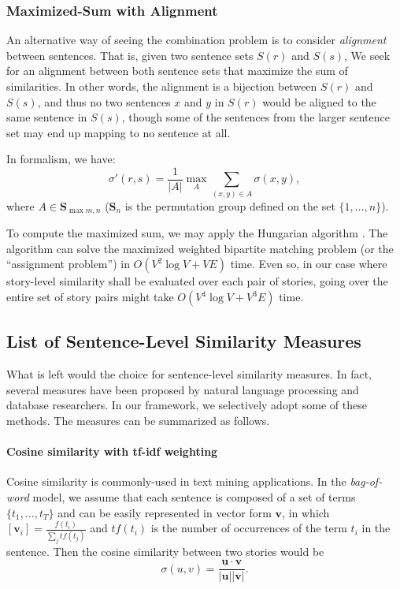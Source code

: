 \documentclass{article}[12pt]
\begin{document}
\subsubsection{Maximized-Sum with Alignment}

An alternative way of seeing the combination problem is to consider
\emph{alignment} between sentences.  That is, given two sentence sets $S(r)$
and $S(s)$, We seek for an alignment between both sentence sets that maximize
the sum of similarities.  In other words, the alignment is a bijection between
$S(r)$ and $S(s)$, and thus no two sentences $x$ and $y$ in $S(r)$ would be
aligned to the same sentence in $S(s)$, though some of the sentences from the
larger sentence set may end up mapping to no sentence at all.  

In formalism, we have: \[\sigma'(r,s) =
\frac{1}{|A|}\max\limits_A \sum\limits_{(x,y) \in A} \sigma(x,y),\] where $A
\in \mathbf{S}_{\max m,n}$ ($\mathbf{S}_n$ is the permutation group defined on
the set $\{1, \ldots, n\}$).  

To compute the maximized sum, we may apply the Hungarian algorithm
\cite{munkres1957aaa}.  The algorithm can solve the maximized weighted
bipartite matching problem (or the ``assignment problem'') in $O(V^2 \log V +
VE)$ time.  Even so, in our case where story-level similarity shall be
evaluated over each pair of stories, going over the entire set of story pairs
might take $O(V^4 \log V + V^3 E)$ time.

\subsection{List of Sentence-Level Similarity Measures}\label{sentencelevel}

What is left would the choice for sentence-level similarity measures.  In fact,
several measures have been proposed by natural language processing and database
researchers.  In our framework, we selectively adopt some of these methods.
The measures can be summarized as follows.

\paragraph{Cosine similarity with tf-idf weighting} Cosine similarity is
commonly-used in text mining applications.  In the \emph{bag-of-word} model, we
assume that each sentence is composed of a set of terms $\{t_1, \ldots, t_T\}$
and can be easily represented in vector form $\mathbf{v}$, in which
$[\mathbf{v}_i] = \frac{f(t_i)}{\sum\limits_j tf(t_j)}$ and $tf(t_i)$ is the
number of occurrences of the term $t_i$ in the sentence.  Then the cosine
similarity between two stories would be \[\sigma(u,v) =
\frac{\mathbf{u}\cdot\mathbf{v}}{|\mathbf{u}| |\mathbf{v}|}.\]
\end{document}
